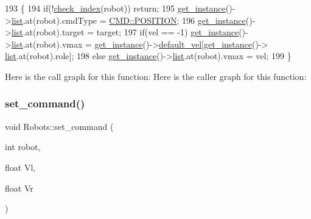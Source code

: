 \begin{DoxyCode}
193                                                              \{
194     \textcolor{keywordflow}{if}(!\hyperlink{robots_8hpp_ae3e6ae8f87cdc750c0b99bc609d9ae43}{check\_index}(robot)) \textcolor{keywordflow}{return};
195     \hyperlink{class_robots_a589bce74db5f34af384952d48435168f}{get\_instance}()->\hyperlink{class_robots_a2c6b77265028f82a4342ca1ef15ed305}{list}.at(robot).cmdType = \hyperlink{serial_w_8hpp_a440f0e10bb28b153f5661c934bc6b89f}{CMD::POSITION};
196     \hyperlink{class_robots_a589bce74db5f34af384952d48435168f}{get\_instance}()->\hyperlink{class_robots_a2c6b77265028f82a4342ca1ef15ed305}{list}.at(robot).target = target;
197     \textcolor{keywordflow}{if}(vel == -1) \hyperlink{class_robots_a589bce74db5f34af384952d48435168f}{get\_instance}()->\hyperlink{class_robots_a2c6b77265028f82a4342ca1ef15ed305}{list}.at(robot).vmax = 
      \hyperlink{class_robots_a589bce74db5f34af384952d48435168f}{get\_instance}()->\hyperlink{class_robots_a6c03d49137645a67d5c5e39bb953a788}{default\_vel}[\hyperlink{class_robots_a589bce74db5f34af384952d48435168f}{get\_instance}()->
      \hyperlink{class_robots_a2c6b77265028f82a4342ca1ef15ed305}{list}.at(robot).role];
198     \textcolor{keywordflow}{else} \hyperlink{class_robots_a589bce74db5f34af384952d48435168f}{get\_instance}()->\hyperlink{class_robots_a2c6b77265028f82a4342ca1ef15ed305}{list}.at(robot).vmax = vel;
199 \}
\end{DoxyCode}
Here is the call graph for this function\+:
Here is the caller graph for this function\+:
\mbox{\label{class_robots_a9b22b0778d337d95824a44f52715ff0a}} 
\subsubsection{\texorpdfstring{set\+\_\+command()}{set\_command()}\hspace{0.1cm}{\footnotesize\ttfamily [2/3]}}
{\footnotesize\ttfamily void Robots\+::set\+\_\+command (\begin{DoxyParamCaption}\item[{int}]{robot,  }\item[{float}]{Vl,  }\item[{float}]{Vr }\end{DoxyParamCaption})\hspace{0.3cm}{\ttfamily [static]}}


